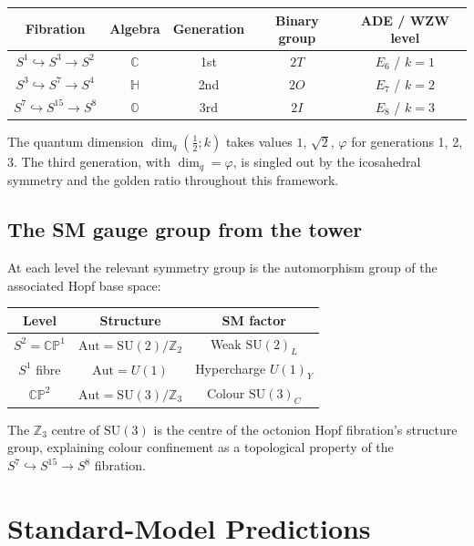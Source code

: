 \documentclass[11pt,a4paper]{article}
\theoremstyle{definition}
\theoremstyle{remark}
\newcommand{\vp}{\varphi}
\begin{document}
\begin{center}
\begin{tabular}{ccccc}
\toprule
Fibration & Algebra & Generation & Binary group & ADE / WZW level \\
\midrule
$S^1\hookrightarrow S^3\to S^2$ & $\mathbb{C}$ & 1st & $2T$ & $E_6$ / $k=1$ \\
$S^3\hookrightarrow S^7\to S^4$ & $\mathbb{H}$ & 2nd & $2O$ & $E_7$ / $k=2$ \\
$S^7\hookrightarrow S^{15}\to S^8$ & $\mathbb{O}$ & 3rd & $2I$ & $E_8$ / $k=3$ \\
\bottomrule
\end{tabular}
\end{center}

\noindent
The quantum dimension $\dim_q(\tfrac{1}{2};k)$ takes values $1$,
$\sqrt{2}$, $\vp$ for generations 1, 2, 3.  The third generation, with
$\dim_q=\vp$, is singled out by the icosahedral symmetry and the golden
ratio throughout this framework.

\subsection{The SM gauge group from the tower}

At each level the relevant symmetry group is the automorphism group of the
associated Hopf base space:
\begin{center}
\begin{tabular}{ccc}
\toprule
Level & Structure & SM factor \\
\midrule
$S^2 = \mathbb{CP}^1$ & $\mathrm{Aut} = \mathrm{SU}(2)/\mathbb{Z}_2$ & Weak $\mathrm{SU}(2)_L$ \\
$S^1$ fibre & $\mathrm{Aut} = U(1)$ & Hypercharge $U(1)_Y$ \\
$\mathbb{CP}^2$ & $\mathrm{Aut} = \mathrm{SU}(3)/\mathbb{Z}_3$ & Colour $\mathrm{SU}(3)_C$ \\
\bottomrule
\end{tabular}
\end{center}
The $\mathbb{Z}_3$ centre of $\mathrm{SU}(3)$ is the centre of the
octonion Hopf fibration's structure group, explaining colour confinement as
a topological property of the $S^7\hookrightarrow S^{15}\to S^8$ fibration.

\section{Standard-Model Predictions}
\label{P1:sec:predictions}
 
\end{document}
